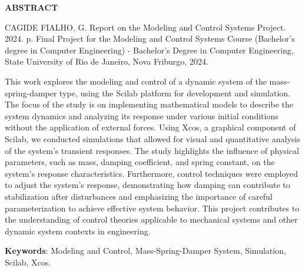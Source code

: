 \begin{titlepage}
    \thispagestyle{empty} %

    \begin{center}
        \textbf{\Large ABSTRACT}
    \end{center}

    \vspace{1cm} %

    \noindent CAGIDE FIALHO, G. Report on the Modeling and Control Systems Project. 2024. \pageref{LastPage} p. Final Project for the Modeling and Control Systems Course (Bachelor’s degree in Computer Engineering) - Bachelor’s Degree in Computer Engineering, State University of Rio de Janeiro, Nova Friburgo, 2024.

    \vspace{0.4cm} %

    This work explores the modeling and control of a dynamic system of the mass-spring-damper type, using the Scilab platform for development and simulation. The focus of the study is on implementing mathematical models to describe the system dynamics and analyzing its response under various initial conditions without the application of external forces. Using Xcos, a graphical component of Scilab, we conducted simulations that allowed for visual and quantitative analysis of the system's transient responses. The study highlights the influence of physical parameters, such as mass, damping coefficient, and spring constant, on the system's response characteristics. Furthermore, control techniques were employed to adjust the system's response, demonstrating how damping can contribute to stabilization after disturbances and emphasizing the importance of careful parameterization to achieve effective system behavior. This project contributes to the understanding of control theories applicable to mechanical systems and other dynamic system contexts in engineering.
    \vspace{0.4cm} %

    \textbf{Keywords}: Modeling and Control, Mass-Spring-Damper System, Simulation, Scilab, Xcos.
\end{titlepage}
